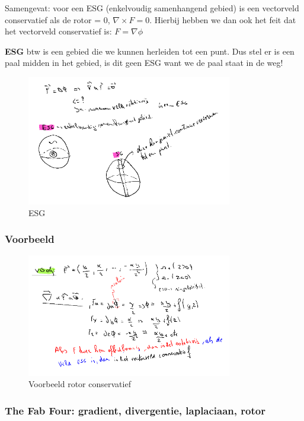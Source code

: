 \documentclass[a4paper]{report}
\begin{document}
Samengevat: voor een ESG (enkelvoudig samenhangend gebied) is een vectorveld conservatief als de rotor = 0, $\nabla \times F = 0$. Hierbij hebben we dan ook het feit dat het vectorveld conservatief is: $F = \nabla \phi$

\textbf{ESG} btw is een gebied die we kunnen herleiden tot een punt. Dus stel er is een paal midden in het gebied, is dit geen ESG want we de paal staat in de weg!


\begin{figure}[H]
	\centering
	\includegraphics[width=0.8\textwidth]{assets/ESG.png}
	\caption{ESG}
	\label{fig:esg}
\end{figure}

\subsubsection{Voorbeeld}

\begin{figure}[H]
	\centering
	\includegraphics[width=0.8\textwidth]{assets/voorbeeld_rotor_conservatief.png}
	\caption{Voorbeeld rotor conservatief}
	\label{fig:voorbeeld_rotor_conservatief}
\end{figure}


\subsubsection{The Fab Four: gradient, divergentie, laplaciaan, rotor}
\end{document}

